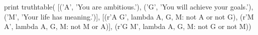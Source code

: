 \documentclass[12pt,letterpaper]{article}
\begin{document}
\begin{python}[truth.py]
print truthtable(
[('A', 'You are ambitious.'), ('G', 'You will achieve your goals.'), ('M',  'Your life has meaning.')],
[(r'A \rightarrow \neg G', lambda A, G, M: not A or not G), (r'M \rightarrow A', lambda A, G, M: not M or A)],
(r'G \rightarrow \neg M', lambda A, G, M: not G or not M))
\end{python}
\end{document}
